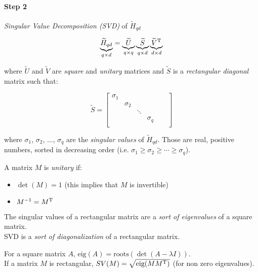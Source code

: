 \paragraph{Step 2} \emph{Singular Value Decomposition (SVD)} of $\tilde{H}_{qd}$

\[
    \underbrace{\widetilde{H}_{qd}}_{q\times d} = \underbrace{\widetilde{U}}_{q\times q} \underbrace{\widetilde{S}}_{q\times d} \underbrace{\widetilde{V}^{\mathrm{T}}}_{d\times d}
\]

where $\tilde{U}$ and $\tilde{V}$ are \emph{square} and \emph{unitary} matrices and $\tilde{S}$ is a \emph{rectangular diagonal} matrix such that:

\[
    \tilde{S} = \begin{bmatrix}
        \sigma_1 & & & & &\\
        & \sigma_2 & & & &\\
        & & \ddots & & &\\
        & & & \sigma_q & &\\
    \end{bmatrix}
\]

where $\sigma_1$, $\sigma_2$, $\ldots$, $\sigma_q$ are the \emph{singular values} of $\tilde{H}_{qd}$.
Those are real, positive numbers, sorted in decreasing order (i.e. $\sigma_1 \ge \sigma_2 \ge \cdots \ge \sigma_q$).

\begin{defn}
    A matrix $M$ is \emph{unitary} if:
    \begin{itemize}
        \item $\det (M) = 1$ \quad (this implies that $M$ is invertible)
        \item $M^{-1} = M^{\mathrm{T}}$
    \end{itemize}
\end{defn}

\begin{rem}
    The singular values of a rectangular matrix are a \emph{sort of eigenvalues} of a square matrix.\\
    SVD is a \emph{sort of diagonalization} of a rectangular matrix.
\end{rem}

\begin{rem}
    For a square matrix $A$, $\text{eig}(A) = \text{roots}(\det(A-\lambda I))$. \\
    If a matrix $M$ is rectangular, $SV(M) = \sqrt{\text{eig}(MM^{\mathrm{T}})}$ (for non zero eigenvalues).
\end{rem}

